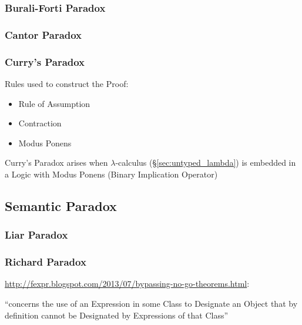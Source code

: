 \subsubsection{Burali-Forti Paradox}\label{sec:baruliforti_paradox}

\subsubsection{Cantor Paradox}\label{sec:cantor_paradox}

\subsubsection{Curry's Paradox}\label{sec:currys_paradox}

Rules used to construct the Proof:
\begin{itemize}
  \item Rule of Assumption
  \item Contraction
  \item Modus Ponens
\end{itemize}

Curry's Paradox arises when $\lambda$-calculus
(\S\ref{sec:untyped_lambda}) is embedded in a Logic with Modus Ponens
(Binary Implication Operator)



\subsection{Semantic Paradox}\label{sec:semantic_paradox}

\subsubsection{Liar Paradox}\label{sec:liar_paradox}

\subsubsection{Richard Paradox}\label{sec:richard_paradox}

\url{http://fexpr.blogspot.com/2013/07/bypassing-no-go-theorems.html}:

``concerns the use of an Expression in some Class to Designate an
Object that by definition cannot be Designated by Expressions of that
Class''


